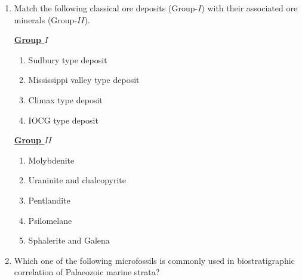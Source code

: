 \documentclass[journal,12pt,onecolumn]{IEEEtran}
\theoremstyle{remark}
\begin{document}
\begin{enumerate}
    \item Match the following classical ore deposits (Group-$I$) with their associated ore minerals (Group-$II$). \hfill{}
        \begin{multicols}{2}
            \underline{\textbf{Group $I$}}
            \begin{enumerate}[start=16]
                \item Sudbury type deposit
                \item Mississippi valley type deposit
                \item Climax type deposit
                \item IOCG type deposit
            \end{enumerate}
            
            \columnbreak
            
            \underline{\textbf{Group $II$}}
            \begin{enumerate}
                \item Molybdenite
                \item Uraninite and chalcopyrite
                \item Pentlandite
                \item Psilomelane
                \item Sphalerite and Galena
            \end{enumerate}
        \end{multicols}
        \begin{enumerate}
        \end{enumerate}
    
    \item Which one of the following microfossils is commonly used in biostratigraphic correlation of Palaeozoic marine strata? \hfill{}
        \begin{enumerate} 
        \end{enumerate}
    

\end{enumerate}
\end{document}
